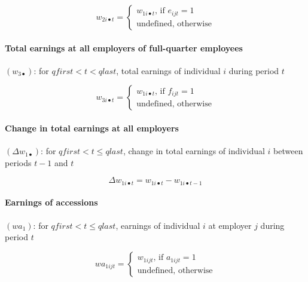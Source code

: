 \begin{equation}
w_{2i\bullet t}=\left\{ 
\begin{array}{l}
{w_{1i\bullet t}}\text{, if }{e_{ijt}=1} \\ 
\text{{undefined, otherwise}}%
\end{array}%
\right.
\end{equation}

\paragraph{Total earnings at all employers of full-quarter employees}


$\left( w_{3\bullet }\right) $: for $qfirst<t<qlast$, total earnings of
individual $i$ during period $t$

\begin{equation}
w_{3i\bullet t}=\left\{ 
\begin{array}{l}
{w_{1i\bullet t}}\text{, if }{f_{ijt}=1} \\ 
\text{{undefined, otherwise}}%
\end{array}%
\right.
\end{equation}

\paragraph{Change in total earnings at all employers}


$\left( \Delta w_{1\bullet }\right) $: for $qfirst<t\leq qlast$, change in
total earnings of individual $i$ between periods $t-1$ and $t$

\begin{equation}
\Delta w_{1i\bullet t} = w_{1i\bullet t} - w_{1i\bullet t - 1}
\end{equation}

\paragraph{Earnings of accessions}


$\left( wa_{1}\right) $: for $qfirst<t\leq qlast$, earnings of individual $i$
at employer $j$ during period $t$

\begin{equation}
wa_{1ijt}=\left\{ 
\begin{array}{l}
{w_{1ijt}}\text{, if }{a_{1ijt}=1} \\ 
\text{{undefined, otherwise}}%
\end{array}%
\right.
\end{equation}

